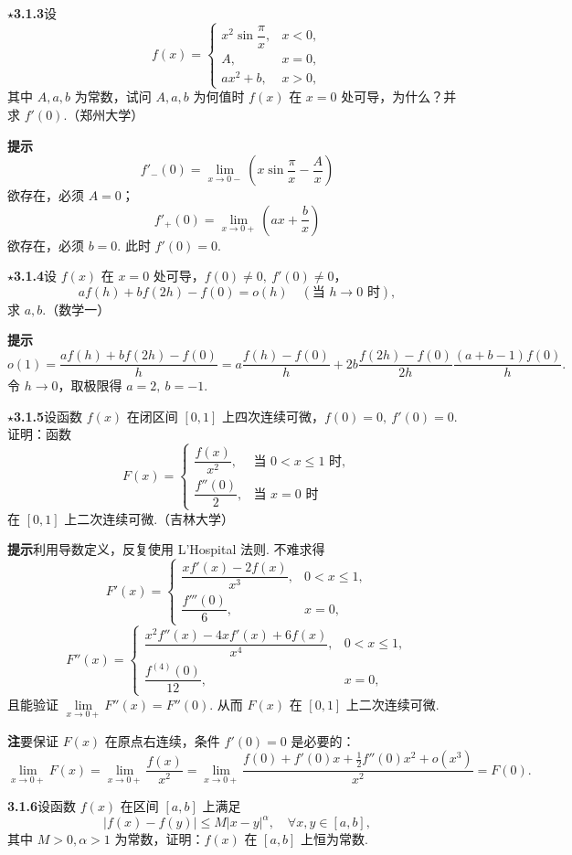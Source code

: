 \documentclass[UTF8, 12pt, fontset=fandol, oneside]{ctexart}
\begin{document}
\noindent\textbf{$\star$3.1.3}\quad 设
\[
f(x)=
\begin{cases}
x^2\sin\dfrac\pi x, & x<0,\\
A, & x=0,\\
ax^2+b, & x>0,
\end{cases}
\]
其中 $A,a,b$ 为常数，试问 $A,a,b$ 为何值时 $f(x)$ 在 $x=0$ 处可导，为什么？并求 $f'(0)$.（郑州大学）

\noindent\textbf{提示}\quad
\[
  f'_-(0)=\lim_{x\to0-}\left(x\sin\frac\pi x-\frac Ax\right)
\]
欲存在，必须 $A=0$；
\[
  f'_+(0)=\lim_{x\to0+}\left(ax+\frac bx\right)
\]
欲存在，必须 $b=0$. 此时 $f'(0)=0$.

\noindent\textbf{$\star$3.1.4}\quad 设 $f(x)$ 在 $x=0$ 处可导，$f(0)\ne0,\ f'(0)\ne0$，
\[
  af(h)+bf(2h)-f(0)=o(h)\quad(\text{当 }h\to0\text{ 时}),
\]
求 $a,b$.（数学一）

\noindent\textbf{提示}\quad
\[
o(1)=\frac{af(h)+bf(2h)-f(0)}h
=a\frac{f(h)-f(0)}h+2b\frac{f(2h)-f(0)}{2h}
\frac{(a+b-1)f(0)}h.
\]
令 $h\to0$，取极限得 $a=2,\ b=-1$.

\noindent\textbf{$\star$3.1.5}\quad 设函数 $f(x)$ 在闭区间 $[0,1]$ 上四次连续可微，$f(0)=0,\ f'(0)=0$. 证明：函数
\[
F(x)=
\begin{cases}
\dfrac{f(x)}{x^2}, & \text{当 }0<x\le1\text{ 时},\\
\dfrac{f''(0)}2, & \text{当 }x=0\text{ 时}
\end{cases}
\]
在 $[0,1]$ 上二次连续可微.（吉林大学）

\noindent\textbf{提示}\quad 利用导数定义，反复使用 L'Hospital 法则. 不难求得
\[
F'(x)=
\begin{cases}
\dfrac{xf'(x)-2f(x)}{x^3}, & 0<x\le1,\\
\dfrac{f'''(0)}6, & x=0,
\end{cases}
\]
\[
F''(x)=
\begin{cases}
\dfrac{x^2f''(x)-4xf'(x)+6f(x)}{x^4}, & 0<x\le1,\\
\dfrac{f^{(4)}(0)}{12}, & x=0,
\end{cases}
\]
且能验证 $\lim\limits_{x\to0+}F''(x)=F''(0)$. 从而 $F(x)$ 在 $[0,1]$ 上二次连续可微.

\noindent\textbf{注}\quad 要保证 $F(x)$ 在原点右连续，条件 $f'(0)=0$ 是必要的：
\[
  \lim_{x\to0+}F(x)=\lim_{x\to0+}\frac{f(x)}{x^2}
  =\lim_{x\to0+}\frac{f(0)+f'(0)x+\frac12f''(0)x^2+o(x^3)}{x^2}=F(0).
\]

\noindent\textbf{3.1.6}\quad 设函数 $f(x)$ 在区间 $[a,b]$ 上满足
\[
  |f(x)-f(y)|\le M|x-y|^\alpha,\quad \forall x,y\in[a,b],
\]
其中 $M>0,\alpha>1$ 为常数，证明：$f(x)$ 在 $[a,b]$ 上恒为常数.
\end{document}
